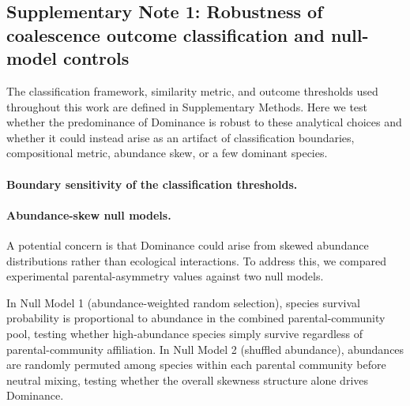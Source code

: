 
\subsection*{Supplementary Note 1: Robustness of coalescence outcome classification and null-model controls}
\label{sec:suppl:note1}

The classification framework, similarity metric, and outcome thresholds used throughout this work are defined in Supplementary Methods. Here we test whether the predominance of Dominance is robust to these analytical choices and whether it could instead arise as an artifact of classification boundaries, compositional metric, abundance skew, or a few dominant species.

\paragraph{Boundary sensitivity of the classification thresholds.}

\paragraph{Abundance-skew null models.}
A potential concern is that Dominance could arise from skewed abundance distributions rather than ecological interactions. To address this, we compared experimental parental-asymmetry values against two null models.

In Null Model 1 (abundance-weighted random selection), species survival probability is proportional to abundance in the combined parental-community pool, testing whether high-abundance species simply survive regardless of parental-community affiliation. In Null Model 2 (shuffled abundance), abundances are randomly permuted among species within each parental community before neutral mixing, testing whether the overall skewness structure alone drives Dominance.

